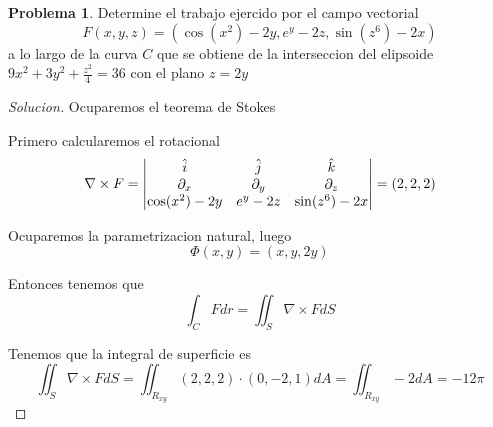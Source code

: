 \documentclass{article}
\theoremstyle{definition}
\newtheorem{problem}{Problema}
\newenvironment{solution}{\begin{proof}[Solucion]}{\end{proof}}
\begin{document}
\begin{problem}
  Determine el trabajo ejercido por el campo vectorial
  \begin{equation*}
    F(x, y, z) = (\cos(x^{2}) - 2y, e^{y} - 2z, \sin(z^{6}) - 2x)
  \end{equation*}
  a lo largo de la curva $C$ que se obtiene de la interseccion del elipsoide $9x^{2} + 3y^{2} + \frac{z^{2}}{4} = 36$ con el plano $z = 2y$
\end{problem}
\begin{solution}
Ocuparemos el teorema de Stokes

Primero calcularemos el rotacional
\begin{equation*}
  \nabla \times F = \begin{vmatrix} \hat{i} & \hat{j} & \hat{k}\\ \partial_x & \partial_y & \partial_z\\ \cos(x^{2}) - 2y & e^{y} - 2z & \sin(z^{6}) - 2x\end{vmatrix} = (2, 2, 2)
\end{equation*}

Ocuparemos la parametrizacion natural, luego
\begin{equation*}
  \Phi(x, y) = (x, y, 2y)
\end{equation*}

Entonces tenemos que
\begin{equation*}
  \int_{C} F dr = \iint_{S} \nabla \times F dS
\end{equation*}

Tenemos que la integral de superficie es
\begin{equation*}
  \iint_{S} \nabla \times F dS = \iint_{R_{xy}}(2, 2, 2) \cdot (0, -2, 1) dA = \iint_{R_{xy}} -2 dA = -12\pi
\end{equation*}

\end{solution}
\end{document}
